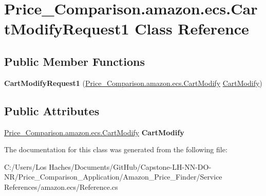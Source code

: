 \hypertarget{class_price___comparison_1_1amazon_1_1ecs_1_1_cart_modify_request1}{\section{Price\-\_\-\-Comparison.\-amazon.\-ecs.\-Cart\-Modify\-Request1 Class Reference}
\label{class_price___comparison_1_1amazon_1_1ecs_1_1_cart_modify_request1}
}
\subsection*{Public Member Functions}
\begin{DoxyCompactItemize}
\item 
\hypertarget{class_price___comparison_1_1amazon_1_1ecs_1_1_cart_modify_request1_a246e681607240c2608ed0cd902437560}{{\bfseries Cart\-Modify\-Request1} (\hyperlink{class_price___comparison_1_1amazon_1_1ecs_1_1_cart_modify}{Price\-\_\-\-Comparison.\-amazon.\-ecs.\-Cart\-Modify} \hyperlink{class_price___comparison_1_1amazon_1_1ecs_1_1_cart_modify}{Cart\-Modify})}\label{class_price___comparison_1_1amazon_1_1ecs_1_1_cart_modify_request1_a246e681607240c2608ed0cd902437560}

\end{DoxyCompactItemize}
\subsection*{Public Attributes}
\begin{DoxyCompactItemize}
\item 
\hypertarget{class_price___comparison_1_1amazon_1_1ecs_1_1_cart_modify_request1_a13724cc7f3c6fbf9b62d003cbdc4f98b}{\hyperlink{class_price___comparison_1_1amazon_1_1ecs_1_1_cart_modify}{Price\-\_\-\-Comparison.\-amazon.\-ecs.\-Cart\-Modify} {\bfseries Cart\-Modify}}\label{class_price___comparison_1_1amazon_1_1ecs_1_1_cart_modify_request1_a13724cc7f3c6fbf9b62d003cbdc4f98b}

\end{DoxyCompactItemize}


The documentation for this class was generated from the following file\-:\begin{DoxyCompactItemize}
\item 
C\-:/\-Users/\-Los Haches/\-Documents/\-Git\-Hub/\-Capstone-\/\-L\-H-\/\-N\-N-\/\-D\-O-\/\-N\-R/\-Price\-\_\-\-Comparison\-\_\-\-Application/\-Amazon\-\_\-\-Price\-\_\-\-Finder/\-Service References/amazon.\-ecs/Reference.\-cs\end{DoxyCompactItemize}
